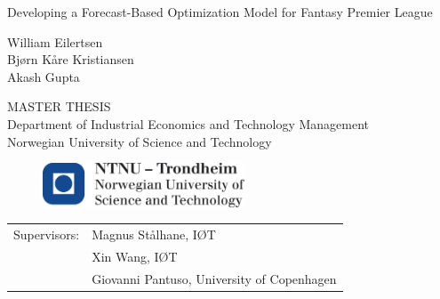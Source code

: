 \vspace*{7cm}


\begin{center}{\vspace{-7cm}}
{\Huge Developing a Forecast-Based Optimization Model for Fantasy Premier League}
\end{center}
\vspace*{7cm}

\begin{center}{\vspace{-4cm}}
{\Large William Eilertsen} \\
{\Large Bj\o rn K\aa re Kristiansen} \\ 
{\Large Akash Gupta} \\
\end{center}

\begin{center}{\vspace{2cm}}
   MASTER THESIS \\ 
   Department of Industrial Economics and Technology Management\\
Norwegian University of Science and Technology
\end{center}

\begin{figure}[H]{\vspace{0.5cm}}
    \centering
    \includegraphics[width = 60mm,scale=0.5]{fig/ntnu_logo.png}
\end{figure}


\begin{table}[b]
    \begin{tabular}{ll}
       Supervisors:  & Magnus St\aa lhane, I\O T \\ 
                     & Xin Wang, I\O T \\
                     & Giovanni Pantuso, University of Copenhagen \\ 
    \end{tabular}
\end{table}

\cleardoublepage